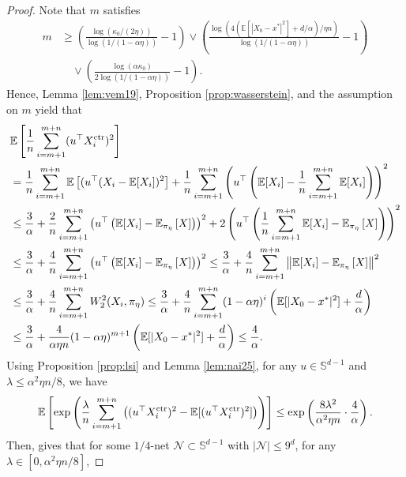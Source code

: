 \documentclass[12pt,reqno]{amsart}
\theoremstyle{remark}
\theoremstyle{definition}
\newcommand{\bbS}{\mathbb{S}}
\newcommand{\calN}{\mathcal{N}}
\newcommand{\E}{\mathbb{E}}
\newcommand{\ctr}{\textnormal{ctr}}
\begin{document}
\begin{proof}
    Note that $m$ satisfies
    \begin{align*}
        m&\ge \left(\frac{\log(\kappa_{0}/(2\eta))}{\log(1/(1-\alpha\eta))}-1\right)\vee \left(\frac{\log(4(\E[|X_{0}-x^{\ast}|^{2}]+d/\alpha)/\eta n)}{\log(1/(1-\alpha\eta))}-1\right)\\
        &\quad\vee \left(\frac{\log(\alpha \kappa_{0})}{2\log(1/(1-\alpha\eta))}-1\right).
    \end{align*}
    Hence, Lemma \ref{lem:vem19}, Proposition \ref{prop:wasserstein}, and the assumption on $m$ yield that
    \begin{align*}
        &\E\left[\frac{1}{n}\sum_{i=m+1}^{m+n}(u^{\top}X_{i}^{\ctr})^{2}\right]\\
        &=\frac{1}{n}\sum_{i=m+1}^{m+n}\E\left[(u^{\top}(X_{i}-\E[X_{i}])^{2}\right]
        +\frac{1}{n}\sum_{i=m+1}^{m+n}\left(u^{\top}\left(\E[X_{i}]-\frac{1}{n}\sum_{i=m+1}^{m+n}\E[X_{i}]\right)\right)^{2}\\
        &\le \frac{3}{\alpha}+\frac{2}{n}\sum_{i=m+1}^{m+n}\left(u^{\top}\left(\E[X_{i}]-\E_{\pi_{\eta}}\left[X\right]\right)\right)^{2}+2\left(u^{\top}\left(\frac{1}{n}\sum_{i=m+1}^{m+n}\E[X_{i}]-\E_{\pi_{\eta}}\left[X\right]\right)\right)^{2}\\
        &\le \frac{3}{\alpha}+\frac{4}{n}\sum_{i=m+1}^{m+n}\left(u^{\top}\left(\E[X_{i}]-\E_{\pi_{\eta}}\left[X\right]\right)\right)^{2}
        \le \frac{3}{\alpha}+\frac{4}{n}\sum_{i=m+1}^{m+n}\left\|\E[X_{i}]-\E_{\pi_{\eta}}\left[X\right]\right\|^{2}\\
        &\le \frac{3}{\alpha}+\frac{4}{n}\sum_{i=m+1}^{m+n}W_{2}^{2}(X_{i},\pi_{\eta})\le \frac{3}{\alpha}+\frac{4}{n}\sum_{i=m+1}^{m+n}(1-\alpha\eta)^{i}\left(\E[|X_{0}-x^{\ast}|^{2}]+\frac{d}{\alpha}\right)\\
        &\le \frac{3}{\alpha}+\frac{4}{\alpha \eta n}(1-\alpha\eta)^{m+1}\left(\E[|X_{0}-x^{\ast}|^{2}]+\frac{d}{\alpha}\right)\le \frac{4}{\alpha}.
    \end{align*}
    Using Proposition \ref{prop:lsi} and Lemma \ref{lem:nai25}, for any $u\in\bbS^{d-1}$ and $\lambda\le \alpha^{2}\eta n/8$, we have
    \begin{equation*}
        \E\left[\exp\left(\frac{\lambda}{n}\sum_{i=m+1}^{m+n}\left((u^{\top}X_{i}^{\ctr})^{2}-\E[(u^{\top}X_{i}^{\ctr})^{2}]\right)\right)\right]\le \exp\left(\frac{8\lambda^{2}}{\alpha^{2}\eta n}\cdot\frac{4}{\alpha}\right).
    \end{equation*}
    Then, \citet{vershynin2018high} gives that for some $1/4$-net $\calN\subset\bbS^{d-1}$ with $|\calN|\le 9^{d}$, for any $\lambda\in [0,\alpha^{2}\eta n/8]$,

\end{proof}
\end{document}
